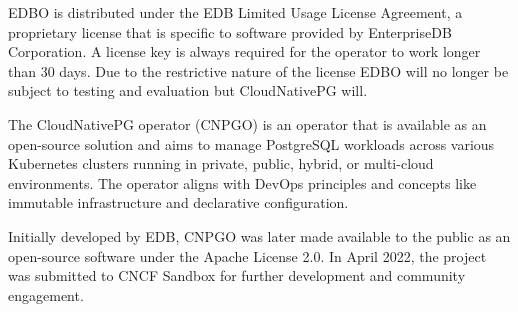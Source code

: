 EDBO is distributed under the EDB Limited Usage License Agreement, a proprietary license that is specific to software provided by EnterpriseDB Corporation. A license key is always required for the operator to work longer than 30 days. \cite{EDBdocuLicence} Due to the restrictive nature of the license EDBO will no longer be subject to testing and evaluation but CloudNativePG will.

\pagebreak

The CloudNativePG operator (CNPGO) is an operator that is available as an open-source solution and aims to manage PostgreSQL workloads across various Kubernetes clusters running in private, public, hybrid, or multi-cloud environments. The operator aligns with DevOps principles and concepts like immutable infrastructure and declarative configuration. \cite{CNPGdocu}

Initially developed by EDB, CNPGO was later made available to the public as an open-source software under the Apache License 2.0. In April 2022, the project was submitted to CNCF Sandbox for further development and community engagement. \cite{CNPGdocu}

